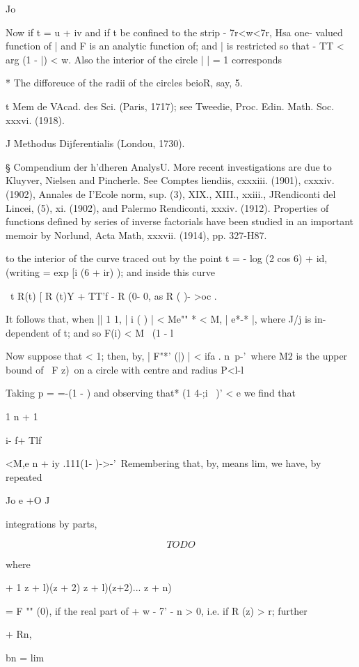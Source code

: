 Jo

Now if t = u + iv and if t be confined to the strip - 7r<w<7r, Hsa
one- valued function of | and F is an analytic function of; and | is
restricted so that - TT < arg (1 - |) < w. Also the interior of the
circle | | = 1 corresponds

* The difforeuce of the radii of the circles beioR, say, 5.

t Mem de VAcad. des Sci. (Paris, 1717); see Tweedie, Proc. Edin. Math.
Soc. xxxvi. (1918).

J Methodus Dijferentialis (Londou, 1730).

§ Compendium der h'dheren AnalysU. More recent investigations are due
to Kluyver, Nielsen and Pincherle. See Comptes liendiis, cxxxiii.
(1901), cxxxiv. (1902), Annales de I'Ecole norm, sup. (3), XIX.,
XIII., xxiii., JRendiconti del Lincei, (5), xi. (1902), and Palermo
Rendiconti, xxxiv. (1912). Properties of functions defined by series
of inverse factorials have been studied in an important memoir by
Norlund, Acta Math, xxxvii. (1914), pp. 327-H87.
%
%

to the interior of the curve traced out by the point t = - log (2 cos
6) + id, (writing = exp [i (6 + ir) ); and inside this curve

\ t R(t) [ R (t)Y + TT'f - R (0- 0, as R ( )- >oc .

It follows that, when || 1 1, | i ( ) | < Me"" * < M, | e*-* |, where
J/j is in- dependent of t; and so F(i) < M \ (1 - l

Now suppose that < 1; then, by, | F"*' (|) | < ifa . n\ p-'\
where M2 is the upper bound of \ F z)\ on a circle with centre and
radius P<l-l

Taking p = =-(1 - ) and observing that* (1 4-;i~ )' < e we find that

1 n + 1

i- f+ Tlf

<M,e n + iy .111(1- )->-'\ Remembering that, by, means lim, we
have, by repeated

Jo e +O J

integrations by parts,

$$
TODO
$$

where

+ 1 z + l)(z + 2) z + l)(z+2)... z + n)

= F "" (0), if the real part of + w - 7' - n > 0, i.e. if R (z) > r;
further

+ Rn,

bn = lim


